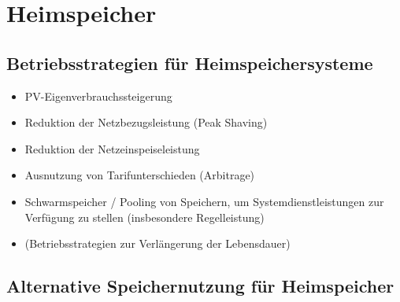 \columnbreak
\section{Heimspeicher}

\subsection{Betriebsstrategien für Heimspeichersysteme}

\begin{itemize}
    \item PV-Eigenverbrauchssteigerung
    \item Reduktion der Netzbezugsleistung (Peak Shaving)
    \item Reduktion der Netzeinspeiseleistung
    \item Ausnutzung von Tarifunterschieden (Arbitrage)
    \item Schwarmspeicher / Pooling von Speichern, um Systemdienstleistungen zur Verfügung zu stellen (insbesondere Regelleistung)
    \item (Betriebsstrategien zur Verlängerung der Lebensdauer)
\end{itemize}



\subsection{Alternative Speichernutzung für Heimspeicher}

